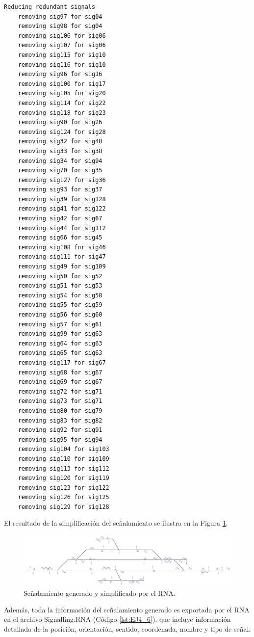 \begin{lstlisting}[language = {}, tabsize=4, basicstyle=\footnotesize\ttfamily, showspaces=false, showstringspaces=false, caption = Reducción de señalamiento por prioridad de señales, label = {lst:EJ4_3}]
	Reducing redundant signals
	removing sig97 for sig04
	removing sig98 for sig04
	removing sig106 for sig06
	removing sig107 for sig06
	removing sig115 for sig10
	removing sig116 for sig10
	removing sig96 for sig16
	removing sig100 for sig17
	removing sig105 for sig20
	removing sig114 for sig22
	removing sig118 for sig23
	removing sig90 for sig26
	removing sig124 for sig28
	removing sig32 for sig40
	removing sig33 for sig38
	removing sig34 for sig94
	removing sig70 for sig35
	removing sig127 for sig36
	removing sig93 for sig37
	removing sig39 for sig128
	removing sig41 for sig122
	removing sig42 for sig67
	removing sig44 for sig112
	removing sig66 for sig45
	removing sig108 for sig46
	removing sig111 for sig47
	removing sig49 for sig109
	removing sig50 for sig52
	removing sig51 for sig53
	removing sig54 for sig58
	removing sig55 for sig59
	removing sig56 for sig60
	removing sig57 for sig61
	removing sig99 for sig63
	removing sig64 for sig63
	removing sig65 for sig63
	removing sig117 for sig67
	removing sig68 for sig67
	removing sig69 for sig67
	removing sig72 for sig71
	removing sig73 for sig71
	removing sig80 for sig79
	removing sig83 for sig82
	removing sig92 for sig91
	removing sig95 for sig94
	removing sig104 for sig103
	removing sig110 for sig109
	removing sig113 for sig112
	removing sig120 for sig119
	removing sig123 for sig122
	removing sig126 for sig125
	removing sig129 for sig128
\end{lstlisting}

	El resultado de la simplificación del señalamiento se ilustra en la Figura \ref{fig:EJ4_7}.
	
	\begin{figure}[H]
		\centering
		\includegraphics[width=1\textwidth]{resultados-obtenidos/ejemplo4/images/4_RNA.png}
		\centering\caption{Señalamiento generado y simplificado por el RNA.}
		\label{fig:EJ4_7}
	\end{figure}
	
	Además, toda la información del señalamiento generado es exportada por el RNA en el archivo Signalling.RNA (Código \ref{lst:EJ4_6}), que incluye información detallada de la posición, orientación, sentido, coordenada, nombre y tipo de señal.
	
